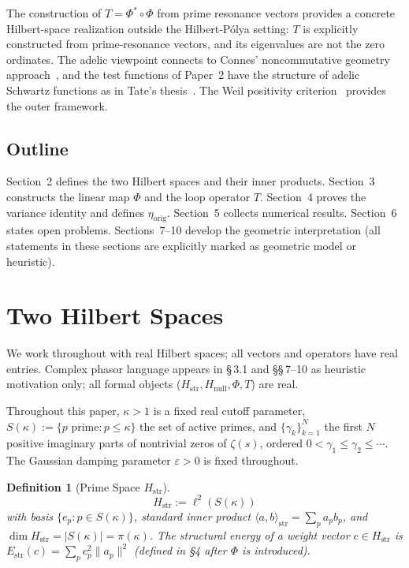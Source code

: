 \documentclass[11pt]{article}
\newtheorem{definition}[theorem]{Definition}
\newcommand{\Hstr}{H_{\mathrm{str}}}
\newcommand{\Hnull}{H_{\mathrm{null}}}
\newcommand{\Estr}{E_{\mathrm{str}}}
\newcommand{\etaorig}{\eta_{\mathrm{orig}}}
\begin{document}
The construction of $T=\Phi^*\circ\Phi$ from prime resonance vectors provides
a concrete Hilbert-space realization outside the Hilbert-P\'olya setting:
$T$ is explicitly constructed from prime-resonance vectors,
and its eigenvalues are not the zero ordinates.
The adelic viewpoint connects to Connes' noncommutative geometry
approach~\cite{Con99}, and the test functions of Paper~2 have the structure
of adelic Schwartz functions as in Tate's thesis~\cite{Tat50}. The Weil
positivity criterion~\cite{Wei52,Lag99} provides the outer framework.

\subsection{Outline}

Section~2 defines the two Hilbert spaces and their inner products.
Section~3 constructs the linear map $\Phi$ and the loop operator $T$.
Section~4 proves the variance identity and defines $\etaorig$.
Section~5 collects numerical results.
Section~6 states open problems.
Sections~7--10 develop the geometric interpretation (all statements in these
sections are explicitly marked as geometric model or heuristic).

\section{Two Hilbert Spaces}

We work throughout with real Hilbert spaces; all vectors and operators have
real entries. Complex phasor language appears in \S\,3.1 and \S\S\,7--10 as
heuristic motivation only; all formal objects ($\Hstr, \Hnull, \Phi, T$)
are real.

Throughout this paper, $\kappa>1$ is a fixed real cutoff parameter,
$S(\kappa):=\{p\text{ prime}:p\leq\kappa\}$ the set of active primes,
and $\{\gamma_k\}_{k=1}^N$ the first $N$ positive imaginary parts of
nontrivial zeros of $\zeta(s)$, ordered $0<\gamma_1\leq\gamma_2\leq\cdots$.
The Gaussian damping parameter $\varepsilon>0$ is fixed throughout.

\begin{definition}[Prime Space $\Hstr$]
\[
\Hstr := \ell^2(S(\kappa))
\]
with basis $\{e_p : p\in S(\kappa)\}$, standard inner product
$\langle a,b\rangle_{\mathrm{str}}=\sum_p a_p b_p$, and
$\dim\Hstr=|S(\kappa)|=\pi(\kappa)$.
The \emph{structural energy} of a weight vector $c\in\Hstr$ is
$\Estr(c)=\sum_p c_p^2\|a_p\|^2$ (defined in \S4 after $\Phi$ is introduced).
\end{definition}
\end{document}
